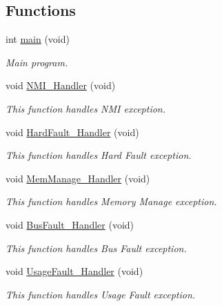 \subsection*{Functions}
\begin{DoxyCompactItemize}
\item 
int \hyperlink{group___a_d_c___interleaved___d_m_amode2_ga840291bc02cba5474a4cb46a9b9566fe}{main} (void)
\begin{DoxyCompactList}\small\item\em Main program. \end{DoxyCompactList}\item 
void \hyperlink{group___a_d_c___interleaved___d_m_amode2_ga6ad7a5e3ee69cb6db6a6b9111ba898bc}{N\-M\-I\-\_\-\-Handler} (void)
\begin{DoxyCompactList}\small\item\em This function handles N\-M\-I exception. \end{DoxyCompactList}\item 
void \hyperlink{group___a_d_c___interleaved___d_m_amode2_ga2bffc10d5bd4106753b7c30e86903bea}{Hard\-Fault\-\_\-\-Handler} (void)
\begin{DoxyCompactList}\small\item\em This function handles Hard Fault exception. \end{DoxyCompactList}\item 
void \hyperlink{group___a_d_c___interleaved___d_m_amode2_ga3150f74512510287a942624aa9b44cc5}{Mem\-Manage\-\_\-\-Handler} (void)
\begin{DoxyCompactList}\small\item\em This function handles Memory Manage exception. \end{DoxyCompactList}\item 
void \hyperlink{group___a_d_c___interleaved___d_m_amode2_ga850cefb17a977292ae5eb4cafa9976c3}{Bus\-Fault\-\_\-\-Handler} (void)
\begin{DoxyCompactList}\small\item\em This function handles Bus Fault exception. \end{DoxyCompactList}\item 
void \hyperlink{group___a_d_c___interleaved___d_m_amode2_ga1d98923de2ed6b7309b66f9ba2971647}{Usage\-Fault\-\_\-\-Handler} (void)
\begin{DoxyCompactList}\small\item\em This function handles Usage Fault exception. \end{DoxyCompactList}\item 

\end{DoxyCompactItemize}

